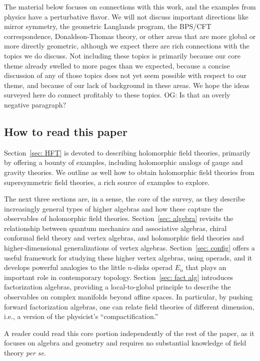 \documentclass[11pt]{amsart}
\def\owen#1{{\textcolor{violet!50!black}{OG: {#1}}}}
\begin{document}
The material below focuses on connections with this work,
and the examples from physics have a perturbative flavor.
We will not discuss important directions like mirror symmetry, the geometric Langlands program, the BPS/CFT correspondence, Donaldson-Thomas theory, or other areas that are more global or more directly geometric,
although we expect there are rich connections with the topics we do discuss.
Not including these topics is primarily because our core theme already swelled to more pages than we expected, 
because a concise discussion of any of those topics does not yet seem possible with respect to our theme,
and because of our lack of background in these areas.
We hope the ideas surveyed here do connect profitably to these topics.
\owen{Is that an overly negative paragraph?}

\subsection{How to read this paper}

Section~\ref{sec: HFT} is devoted to describing holomorphic field theories, primarily by offering a bounty of examples, including holomorphic analogs of gauge and gravity theories.
We outline as well how to obtain holomorphic field theories from supersymmetric field theories,
a rich source of examples to explore.

The next three sections are, in a sense, the core of the survey,
as they describe increasingly general types of higher algebras and how these capture the observables of holomorphic field theories.
Section~\ref{sec: algebra} revisits the relationship between quantum mechanics and associative algebras,
chiral conformal field theory and vertex algebras,
and holomorphic field theories and higher-dimensional generalizations of vertex algebras.
Section~\ref{sec: config} offers a useful framework for studying these higher vertex algebras,
using operads,
and it develops powerful analogies to the little $n$-disks operad $E_n$ that plays an important role in contemporary topology.
Section~\ref{sec: fact alg} introduces factorization algebras,
providing a local-to-global principle to describe the observables on complex manifolds beyond affine spaces.
In particular, by pushing forward factorization algebras,
one can relate field theories of different dimension,
i.e., a version of the physicist's ``compactification.''

A reader could read this core portion independently of the rest of the paper,
as it focuses on algebra and geometry and requires no substantial knowledge of field theory {\it per se}.
\end{document}
